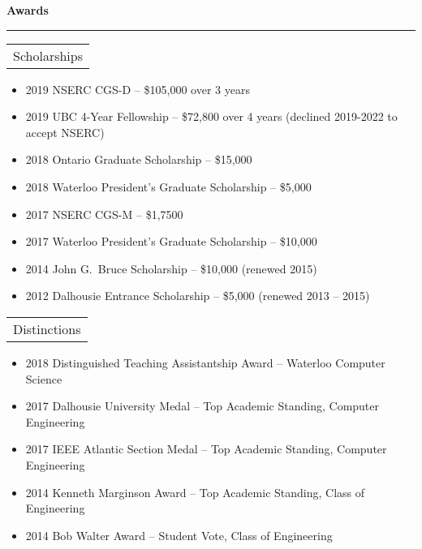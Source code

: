 \documentclass{article}
\newcommand{\heading}[1]
{
	\vspace{3pt}
	{\bf #1} 
	\vspace{-6pt}
	
	\rule{\linewidth}{0.4pt}
}
\begin{document}
\heading{Awards}
\begin{tabularx}{\textwidth}{X}
    Scholarships \\
\end{tabularx}
\begin{itemize}
\item 2019 NSERC CGS-D -- \$105,000 over 3 years
\item 2019 UBC 4-Year Fellowship -- \$72,800 over 4 years (declined 2019-2022 to accept NSERC)
\item 2018 Ontario Graduate Scholarship -- \$15,000
\item 2018 Waterloo President's Graduate Scholarship -- \$5,000
\item 2017 NSERC CGS-M -- \$1,7500
\item 2017 Waterloo President's Graduate Scholarship -- \$10,000
\item 2014 John G.~Bruce Scholarship -- \$10,000 (renewed 2015)
\item 2012 Dalhousie Entrance Scholarship -- \$5,000 (renewed 2013 -- 2015)
\end{itemize}
\begin{tabularx}{\textwidth}{X}
    Distinctions \\
\end{tabularx}
\begin{itemize}
\item 2018 Distinguished Teaching Assistantship Award -- Waterloo Computer Science
\item 2017 Dalhousie University Medal -- Top Academic Standing, Computer Engineering
\item 2017 IEEE Atlantic Section Medal -- Top Academic Standing, Computer Engineering
\item 2014 Kenneth Marginson Award -- Top Academic Standing, Class of Engineering
\item 2014 Bob Walter Award -- Student Vote, Class of Engineering 
\end{itemize}

\clearpage
\end{document}
